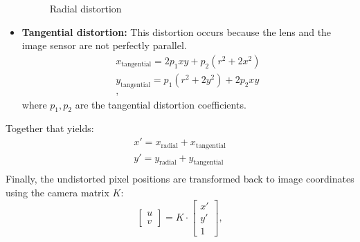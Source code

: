 \begin{itemize}
\begin{figure}[H]
        \caption{Radial distortion}
        \label{fig:radial_distortion}
    \end{figure}


    \item \textbf{Tangential distortion:} This distortion occurs because the lens and the image sensor are not perfectly parallel.
    \begin{gather*}
        x_{\text{tangential}} = 2p_1 xy + p_2(r^2 + 2x^2)\\
        y_{\text{tangential}} = p_1(r^2 + 2y^2) + 2p_2 xy\\,
    \end{gather*}
    where \( p_1, p_2 \) are the tangential distortion coefficients.
\end{itemize}
Together that yields:
\begin{gather*}
    x' = x_{\text{radial}} + x_{\text{tangential}}\\
    y' = y_{\text{radial}} + y_{\text{tangential}}\\
\end{gather*}
Finally, the undistorted pixel positions are transformed back to image coordinates using the camera matrix \( K \):
\[
    \begin{bmatrix}
        u \\
        v
    \end{bmatrix}
    =
    K \cdot
    \begin{bmatrix}
        x' \\
        y' \\
        1
    \end{bmatrix},
\]
